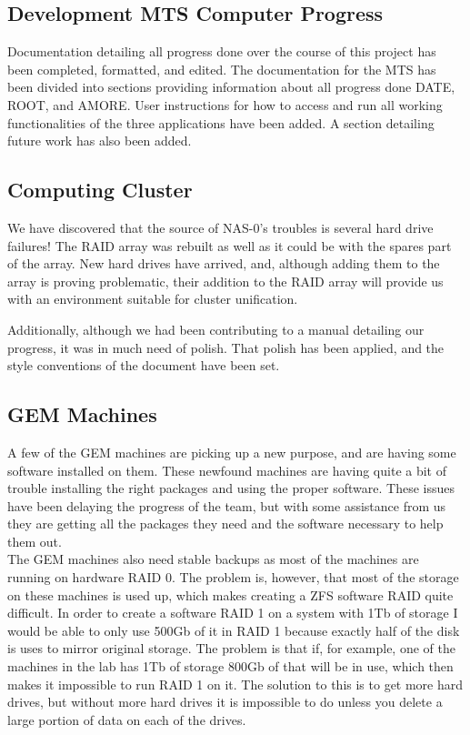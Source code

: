 \documentclass[12pt]{article}
\newcommand\tab[1][1cm]{\hspace*{#1}}
\begin{document}
\subsection{Development MTS Computer Progress}

\tab Documentation detailing all progress done over the course of this project has been completed, formatted, and edited. The documentation for the MTS has been divided into sections providing information about all progress done DATE, ROOT, and AMORE. User instructions for how to access and run all working functionalities of the three applications have been added. A section detailing future work has also been added.

\subsection{Computing Cluster}

\tab We have discovered that the source of NAS-0's troubles is several hard
drive failures! The RAID array was rebuilt as well as it could be with the
spares part of the array. New hard drives have arrived, and, although adding
them to the array is proving problematic, their addition to the RAID array will
provide us with an environment suitable for cluster unification.

\tab Additionally, although we had been contributing to a manual detailing our
progress, it was in much need of polish. That polish has been applied, and the
style conventions of the document have been set.

\subsection{GEM Machines}

\tab A few of the GEM machines are picking up a new purpose, and are having some software
installed on them. These newfound machines are having quite a bit of trouble installing the 
right packages and using the proper software. These issues have been delaying the progress of
the team, but with some assistance from us they are getting all the packages they need and the 
software necessary to help them out. \\

\tab The GEM machines also need stable backups as most of the machines are running on hardware
RAID 0. The problem is, however, that most of the storage on these machines is used up, which 
makes creating a ZFS software RAID quite difficult. In order to create a software RAID 1 on a system with 1Tb of storage I would be able to only use 500Gb of it in RAID 1 because exactly half
of the disk is uses to mirror original storage. The problem is that if, for example, one of the
machines in the lab has 1Tb of storage 800Gb of that will be in use, which then makes it
impossible to run RAID 1 on it. The solution to this is to get more hard drives, but without more
hard drives it is impossible to do unless you delete a large portion of data on each of the drives. 
\end{document}
